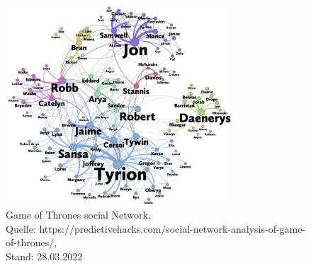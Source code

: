 \FloatBarrier
\begin{figure}[h!]
    \centering
    \includegraphics[width=0.75\textwidth]{Graphics/got-network.png}
    \caption{Game of Thrones social Network,\\
    Quelle: https://predictivehacks.com/social-network-analysis-of-game-of-thrones/,\\ Stand: 28.03.2022}
    \label{fig:GameOfThrones}
\end{figure}


